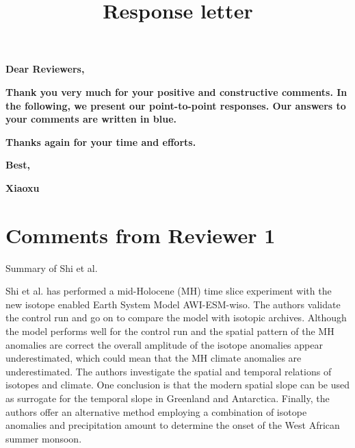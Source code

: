 \documentclass[gmd, manuscript]{copernicus}
\begin{document}
\title{Response letter}






\maketitle


\textbf{Dear Reviewers,}

\textbf{Thank you very much for your positive and constructive comments. In the following, we present our point-to-point responses. Our answers to your comments are written in blue. }

\textbf{Thanks again for your time and efforts.}

 \textbf{Best, }
 
 \textbf{Xiaoxu}

 \medskip

 \section{Comments from Reviewer 1}

Summary of Shi et al.

 \medskip
 
Shi et al. has performed a mid-Holocene (MH) time slice experiment with the new isotope enabled Earth System Model AWI-ESM-wiso. The authors validate the control run and go on to compare the model with isotopic archives. Although the model performs well for the control run and the spatial pattern of the MH anomalies are correct the overall amplitude of the isotope anomalies appear underestimated, which could mean that the MH climate anomalies are underestimated. The authors investigate the spatial and temporal relations of isotopes and climate. One conclusion is that the modern spatial slope can be used as surrogate for the temporal slope in Greenland and Antarctica. Finally, the authors offer an alternative method employing a combination of isotope anomalies and precipitation amount to determine the onset of the West African summer monsoon.
\end{document}
